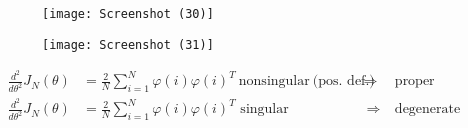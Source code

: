 \begin{figure}
\centering
\begin{minipage}{.5\textwidth}
  \centering
  \texttt{[image: Screenshot (30)]}
  \label{fig:test1}
\end{minipage}%
\begin{minipage}{.5\textwidth}
  \centering
  \texttt{[image: Screenshot (31)]}
  \label{fig:test2}
\end{minipage}
\end{figure}


\begin{equation*}
\begin{aligned}
\frac{d^{2}}{d\theta ^{2}} J_{N}( \theta ) & =\frac{2}{N}\sum _{i=1}^{N} \varphi ( i) \varphi ( i)^{T} \ \text{nonsingular} \ \text{(pos. def.)} & \Longrightarrow \ & \text{proper paraboloid (unique min.)}\\
\frac{d^{2}}{d\theta ^{2}} J_{N}( \theta ) & =\frac{2}{N}\sum _{i=1}^{N} \varphi ( i) \varphi ( i)^{T}\text{ singular} & \ \Longrightarrow \ & \text{degenerate paraboloid}
\end{aligned}
\end{equation*}

